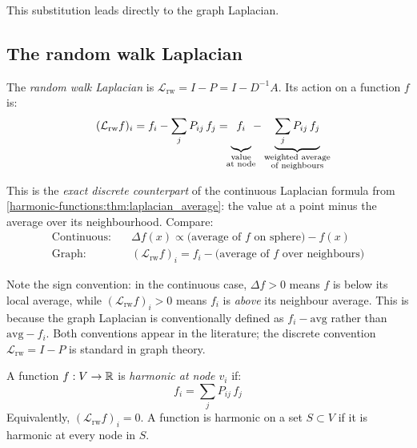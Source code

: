 \begin{notechapter}
This substitution leads directly to the graph Laplacian.

\subsection{The random walk Laplacian}

\begin{definition}
\label{harmonic-functions:def:rw_laplacian}
The \emph{random walk Laplacian} is $\mathcal{L}_{\mathrm{rw}} = I - P
= I - D^{-1}A$. Its action on a function $f$ is:
\begin{equation}
(\mathcal{L}_{\mathrm{rw}} f)_i
= f_i - \sum_j P_{ij}\,f_j
= \underbrace{f_i\vphantom{\sum_j}}_{\mathclap{\substack{\text{value}\\
  \text{at node}}}}
  - \quad \underbrace{\sum_j P_{ij}\,f_j}_{\mathclap{\substack{
  \text{weighted average}\\ \text{of neighbours}}}}
\end{equation}
\end{definition}

This is the \emph{exact discrete counterpart} of the continuous Laplacian
formula from \cref{harmonic-functions:thm:laplacian_average}: the value at a point minus
the average over its neighbourhood. Compare:
\begin{align}
\text{Continuous:} &\quad \Delta f(x) \propto
  \bigl(\text{average of $f$ on sphere}\bigr) - f(x) \\
\text{Graph:} &\quad (\mathcal{L}_{\mathrm{rw}} f)_i
  = f_i - \bigl(\text{average of $f$ over neighbours}\bigr)
\end{align}

\begin{pitfall}
Note the sign convention: in the continuous case, $\Delta f > 0$ means $f$
is below its local average, while $(\mathcal{L}_{\mathrm{rw}} f)_i > 0$
means $f_i$ is \emph{above} its neighbour average. This is because the graph
Laplacian is conventionally defined as $f_i - \text{avg}$ rather than
$\text{avg} - f_i$. Both conventions appear in the literature; the discrete
convention $\mathcal{L}_{\mathrm{rw}} = I - P$ is standard in graph
theory.
\end{pitfall}

\begin{definition}
\label{harmonic-functions:def:harmonic_graph}
A function $f: V \to \mathbb{R}$ is \emph{harmonic at node $v_i$} if:
\begin{equation}
f_i = \sum_j P_{ij}\,f_j
\end{equation}
Equivalently, $(\mathcal{L}_{\mathrm{rw}} f)_i = 0$. A function is harmonic
on a set $S \subset V$ if it is harmonic at every node in $S$.
\end{definition}


\end{notechapter}
